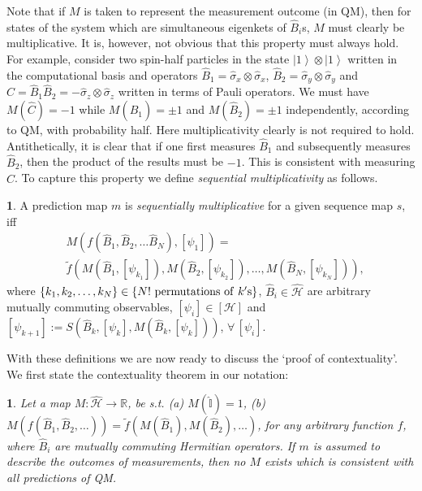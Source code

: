 \documentclass[british,aps,prl,superscriptaddress,nofootinbib,times,reprint]{revtex4-1}
\theoremstyle{plain}
\theoremstyle{plain}
\newtheorem*{thm*}{\protect\theoremname}
\theoremstyle{definition}
\newtheorem{defn}{\protect\definitionname}
\theoremstyle{remark}
\theoremstyle{remark}
\theoremstyle{remark}
\theoremstyle{plain}
\theoremstyle{plain}
\theoremstyle{plain}
\theoremstyle{definition}
\theoremstyle{definition}
\providecommand{\definitionname}{Definition}
\providecommand{\theoremname}{Theorem}
\begin{document}
Note that if $M$ is taken to represent the
measurement outcome (in QM), then for states of
the system which are simultaneous eigenkets of
$\hat{B}_{i}$s, $M$ must clearly be
multiplicative. It is, however, not obvious that
this property must always hold. For example,
consider two spin-half particles in the state 
$\left|1\right\rangle \otimes\left|1\right\rangle
$ written in the computational basis and 
operators 
$\hat{B}_{1}=\hat{\sigma}_{x}\otimes\hat{\sigma}_{x}$,
$\hat{B}_{2}=\hat{\sigma}_{y}\otimes\hat{\sigma}_{y}$
and
$\hat{C}=\hat{B}_{1}\hat{B}_{2}=-\hat{\sigma}_{z}\otimes\hat{\sigma}_{z}$
written in terms of Pauli operators.
We must have $M(\hat{C})=-1$ while
$M(\hat{B}_{1})=\pm1$ and $M(\hat{B}_{2})=\pm1$
independently, according to QM, with probability
half. Here multiplicativity clearly is not
required to hold.
Antithetically, it is clear that if one first
measures $\hat{B}_{1}$ and subsequently measures
$\hat{B}_{2}$, then the product of the results
must be $-1$. This is consistent with measuring
$\hat{C}$. To capture this property we define
\emph{sequential multiplicativity} as follows.
\begin{defn} 
A prediction map $m$ is
\emph{sequentially multiplicative} for a given
sequence map $s$, iff \begin{align*}
&M(f(\hat{B}_{1},\hat{B}_{2},\dots\hat{B}_{N}),[\psi_{1}])=\\
&\tilde
f(M(\hat{B}_{1},[\psi_{k_{1}}]),M(\hat{B}_{2},[\psi_{k_{2}}]),\dots,M(\hat{B}_{N},[\psi_{k_{N}}])),
\end{align*} 
where
$\{k_{1},k_{2},\dots,k_{N}\} \in\{
N! {\rm ~permutations~of~}  k'{\rm s} \}$, 
$\hat{B}_{i}\in\hat{\mathcal{H}}$ are
arbitrary mutually commuting observables,
$[\psi_{i}]\in[\mathcal{H}]$ and
$[\psi_{k+1}] :=
S(\hat{B}_{k},[\psi_{k}],M(\hat{B}_{k},[\psi_{k}]))$,
$\forall\,[\psi_{i}]$.  
\label{defn:seqnMltpl}
\end{defn} 
With these definitions we are now ready to discuss
the `proof of contextuality'. We first state the
contextuality theorem in our notation:
\begin{thm*} Let a map
$M:\hat{\mathcal{H}}\to\mathbb{R}$, be s.t. (a)
$M(\hat{\mathbb{I}})=1$, (b)
$M(f(\hat{B}_{1},\hat{B}_{2},\dots))=\tilde
f(M(\hat{B}_{1}),M(\hat{B}_{2}),\dots)$, for any
arbitrary function $f$, where $\hat{B}_{i}$ are
mutually commuting Hermitian operators. If $m$ is
assumed to describe the outcomes of measurements,
then no $M$ exists which is consistent with all
predictions of QM. 
\label{thm:KS}
\end{thm*}
\end{document}
